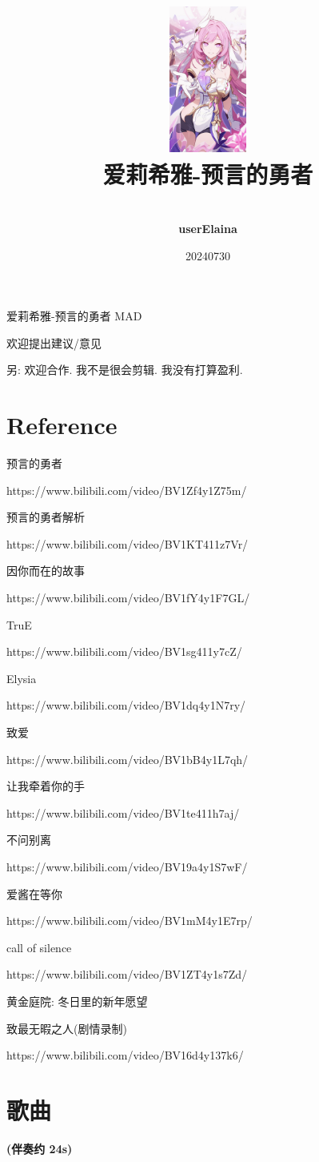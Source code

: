 \documentclass[a4paper]{article}
\title{
    \vspace*{1.0in}
    \includegraphics[width=1in]{figures/100154449_p0.jpg} \\
    \vspace*{1in}
    \textbf{\Huge 爱莉希雅-预言的勇者}
    \vspace{0.5in}
}
\author{ \\
    \textbf{\huge userElaina} \\
    \vspace*{1in}
}
\date{\LARGE 20240730}
\begin{document}
\LARGE

\maketitle
\tableofcontents
\thispagestyle{empty}
\newpage

爱莉希雅-预言的勇者 MAD

欢迎提出建议/意见

另: 欢迎合作. 我不是很会剪辑. 我没有打算盈利.

\section{Reference}

预言的勇者

https://www.bilibili.com/video/BV1Zf4y1Z75m/

预言的勇者解析

https://www.bilibili.com/video/BV1KT411z7Vr/

因你而在的故事

https://www.bilibili.com/video/BV1fY4y1F7GL/

TruE

https://www.bilibili.com/video/BV1sg411y7cZ/

Elysia

https://www.bilibili.com/video/BV1dq4y1N7ry/

致爱

https://www.bilibili.com/video/BV1bB4y1L7qh/

让我牵着你的手

https://www.bilibili.com/video/BV1te411h7aj/

不问别离

https://www.bilibili.com/video/BV19a4y1S7wF/

爱酱在等你

https://www.bilibili.com/video/BV1mM4y1E7rp/

call of silence

https://www.bilibili.com/video/BV1ZT4y1s7Zd/

黄金庭院: 冬日里的新年愿望

致最无暇之人(剧情录制)

https://www.bilibili.com/video/BV16d4y137k6/

\section{歌曲}

\textbf{(伴奏约 24s)}
\end{document}

